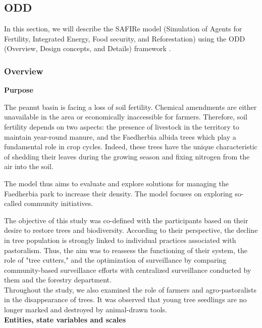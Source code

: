 \documentclass{article}
\begin{document}
\subsection{ODD }

In this section, we will describe the SAFIRe model (Simulation of Agents for Fertility, Integrated Energy, Food security, and Reforestation) using the ODD (Overview, Design concepts, and Details) framework \parencite{grimm_standard_2006,grimm_odd_2010,grimm_odd_2020}.


    \subsubsection{Overview}

        \textbf{Purpose}

        The peanut basin is facing a loss of soil fertility. Chemical amendments are either unavailable in the area or economically inaccessible for farmers. Therefore, soil fertility depends on two aspects: the presence of livestock in the territory to maintain year-round manure, and the Faedherbia albida trees which play a fundamental role in crop cycles. Indeed, these trees have the unique characteristic of shedding their leaves during the growing season and fixing nitrogen from the air into the soil.

        The model thus aims to evaluate and explore solutions for managing the Faedherbia park to increase their density. The model focuses on exploring so-called community initiatives.

        The objective of this study was co-defined with the participants based on their desire to restore trees and biodiversity. According to their perspective, the decline in tree population is strongly linked to individual practices associated with pastoralism. Thus, the aim was to reassess the functioning of their system, the role of "tree cutters," and the optimization of surveillance by comparing community-based surveillance efforts with centralized surveillance conducted by them and the forestry department.\\

        Throughout the study, we also examined the role of farmers and agro-pastoralists in the disappearance of trees. It was observed that young tree seedlings are no longer marked and destroyed by animal-drawn tools.\\

        \textbf{Entities, state variables and scales}
\end{document}
